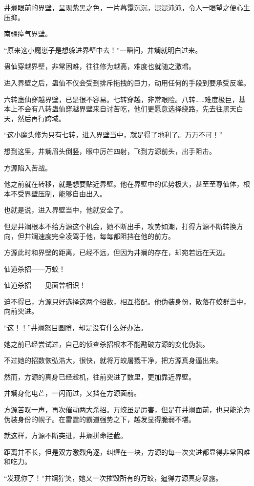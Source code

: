 \begin{this_body}
井斓眼前的界壁，呈现紫黑之色，一片暮霭沉沉，混混沌沌，令人一眼望之便心生压抑。

南疆瘴气界壁。

“原来这小魔崽子是想躲进界壁中去！”一瞬间，井斓就明白过来。

蛊仙穿越界壁，非常困难，往往修为越高，难度也就随之激增。

进入界壁之后，蛊仙不仅会受到排斥拖拽的巨力，动用任何的手段到要承受反噬。

六转蛊仙穿越界壁，已是很不容易。七转穿越，非常艰险。八转……难度极巨，基本上不会有八转蛊仙穿越界壁来自讨苦吃，他们更愿意选择绕路，先去往黑天白天，然后再行跨域。

“这小魔头修为只有七转，进入界壁当中，就是得了地利了。万万不可！”

想到这里，井斓眉头倒竖，眼中厉芒四射，飞到方源前头，出手阻击。

方源陷入苦战。

他之前就在转移，就是想要贴近界壁。他在界壁中的优势极大，甚至至尊仙体，根本不受界壁压制，能够自由出入。

也就是说，进入界壁当中，他就安全了。

但是井斓根本不给方源这个机会，她不断出手，攻势如潮，打得方源不断转换方向，但井斓速度完全凌驾于他，每每都阻挡在他的前方。

方源此时和界壁的距离，已经不远，但因为井斓的存在，却宛若远在天边。

仙道杀招――万蛟！

仙道杀招――见面曾相识！

迫不得已，方源只好选择这两个招数，相互搭配。他伪装身份，散落在蛟群当中，向前突进。

“这！！”井斓怒目圆瞪，却是没有什么好办法。

她之前已经尝试过，自己的侦查杀招根本不能勘破方源的变化伪装。

不过她的招数恢弘浩大，很快，就将万蛟屠戮干净，把方源真身逼出来。

然而，方源的真身已经趁机，往前突进了数里，更加靠近界壁。

井斓身化电芒，一闪而过，又挡在方源面前。

方源苦叹一声，再次催动两大杀招。万蛟虽是厉害，但是在井斓面前，也只能沦为伪装身份的幌子。在雷霆的霸道强势之下，越发显得脆弱不堪。

就这样，方源不断突进，井斓拼命拦截。

距离并不长，但是双方激烈角逐，纠缠在一块，方源的每一次突进都显得非常困难和吃力。

“发现你了！”井斓狞笑，她又一次摧毁所有的万蛟，逼得方源真身暴露。


\end{this_body}
